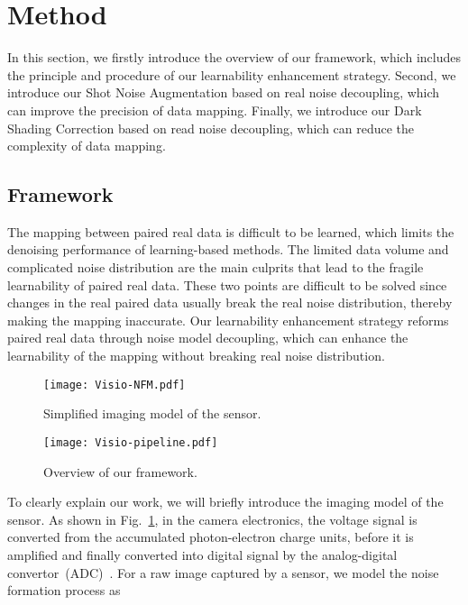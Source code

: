\documentclass[sigconf,screen,nonacm]{acmart}
\begin{document}
\section{Method}\label{Methods}
    In this section, we firstly introduce the overview of our framework, which includes the principle and procedure of our learnability enhancement strategy. Second, we introduce our Shot Noise Augmentation based on real noise decoupling, which can improve the precision of data mapping. Finally, we introduce our Dark Shading Correction based on read noise decoupling, which can reduce the complexity of data mapping.


\subsection{Framework}
\label{Framework}
The mapping between paired real data is difficult to be learned, which limits the denoising performance of learning-based methods. 
The limited data volume and complicated noise distribution are the main culprits that lead to the fragile learnability of paired real data.
These two points are difficult to be solved since changes in the real paired data usually break the real noise distribution, thereby making the mapping inaccurate.
Our learnability enhancement strategy reforms paired real data through noise model decoupling, which can enhance the learnability of the mapping without breaking real noise distribution.

\begin{figure}[t!]
    \begin{center}
      \texttt{[image: Visio-NFM.pdf]}
    \end{center}
    \caption{Simplified imaging model of the sensor.}
    \label{fig:Formation}
\end{figure}
\begin{figure*}[t!]
    \begin{center}
      \texttt{[image: Visio-pipeline.pdf]}
    \end{center}
    \caption{Overview of our framework.}
    \label{fig:framework}
\end{figure*}

To clearly explain our work, we will briefly introduce the imaging model of the sensor.
As shown in Fig.~\ref{fig:Formation}, in the camera electronics, the voltage signal is converted from the accumulated photon-electron charge units, before it is amplified and finally converted into digital signal  by the analog-digital convertor~(ADC)~\cite{EMVA1288}.
For a raw image captured by a sensor, we model the noise formation process as
\end{document}
